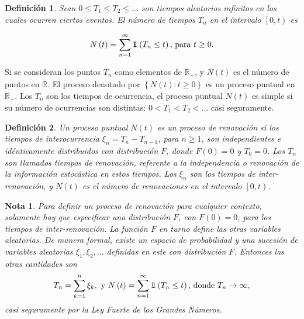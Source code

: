 \documentclass{article}
\newtheorem{Def}{Definición}[section]
\newtheorem{Note}{Nota}[section]
\newcommand{\rea}{\mathbb{R}}
\newcommand{\indora}{\mbox{$1$\hspace{-0.8ex}$1$}}
\numberwithin{equation}{section}
\begin{document}
\begin{Def}\label{Def.Tn}
Sean $0\leq T_{1}\leq T_{2}\leq \ldots$ son tiempos aleatorios infinitos en los cuales ocurren ciertos eventos. El n\'umero de tiempos $T_{n}$ en el intervalo $\left[0,t\right)$ es

\begin{eqnarray}
N\left(t\right)=\sum_{n=1}^{\infty}\indora\left(T_{n}\leq t\right)\textrm{, para }t\geq0.
\end{eqnarray}
\end{Def}

Si se consideran los puntos $T_{n}$ como elementos de $\rea_{+}$, y $N\left(t\right)$ es el n\'umero de puntos en $\rea$. El proceso denotado por $\left\{N\left(t\right):t\geq0\right\}$ es un proceso puntual en $\rea_{+}$. Los $T_{n}$ son los tiempos de ocurrencia, el proceso puntual $N\left(t\right)$ es simple si su n\'umero de ocurrencias son distintas: $0<T_{1}<T_{2}<\ldots$ casi seguramente.

\begin{Def}
Un proceso puntual $N\left(t\right)$ es un proceso de renovaci\'on si los tiempos de interocurrencia $\xi_{n}=T_{n}-T_{n-1}$, para $n\geq1$, son independientes e id\'enticamente distribuidos con distribuci\'on $F$, donde $F\left(0\right)=0$ y $T_{0}=0$. Los $T_{n}$ son llamados tiempos de renovaci\'on, referente a la independencia o renovaci\'on de la informaci\'on estoc\'astica en estos tiempos. Los $\xi_{n}$ son los tiempos de inter-renovaci\'on, y $N\left(t\right)$ es el n\'umero de renovaciones en el intervalo $\left[0,t\right)$.
\end{Def}


\begin{Note}
Para definir un proceso de renovaci\'on para cualquier contexto, solamente hay que especificar una distribuci\'on $F$, con $F\left(0\right)=0$, para los tiempos de inter-renovaci\'on. La funci\'on $F$ en turno define las otras variables aleatorias. De manera formal, existe un espacio de probabilidad y una sucesi\'on de variables aleatorias $\xi_{1},\xi_{2},\ldots$ definidas en este con distribuci\'on $F$. Entonces las otras cantidades son 
\begin{eqnarray}
T_{n}=\sum_{k=1}^{n}\xi_{k},\textrm{ y }N\left(t\right)=\sum_{n=1}^{\infty}\indora\left(T_{n}\leq t\right)\textrm{, donde }T_{n}\rightarrow\infty,
\end{eqnarray}
casi seguramente por la Ley Fuerte de los Grandes N\'umeros.
\end{Note}
\end{document}
